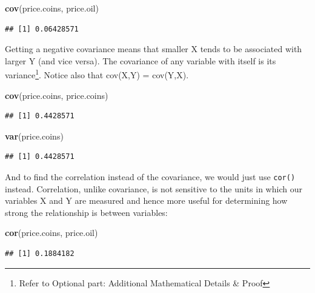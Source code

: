 \documentclass[]{article}
\newenvironment{Shaded}{\begin{snugshade}}{\end{snugshade}}
\newcommand{\KeywordTok}[1]{\textcolor[rgb]{0.13,0.29,0.53}{\textbf{#1}}}
\newcommand{\NormalTok}[1]{#1}
\begin{document}
\begin{Shaded}
\begin{Highlighting}[]
\KeywordTok{cov}\NormalTok{(price.coins, price.oil)}
\end{Highlighting}
\end{Shaded}

\begin{verbatim}
## [1] 0.06428571
\end{verbatim}

Getting a negative covariance means that smaller X tends to be
associated with larger Y (and vice versa). The covariance of any
variable with itself is its variance\footnote{Refer to Optional part:
  Additional Mathematical Details \& Proof}. Notice also that cov(X,Y) =
cov(Y,X).

\begin{Shaded}
\begin{Highlighting}[]
\KeywordTok{cov}\NormalTok{(price.coins, price.coins)}
\end{Highlighting}
\end{Shaded}

\begin{verbatim}
## [1] 0.4428571
\end{verbatim}

\begin{Shaded}
\begin{Highlighting}[]
\KeywordTok{var}\NormalTok{(price.coins)}
\end{Highlighting}
\end{Shaded}

\begin{verbatim}
## [1] 0.4428571
\end{verbatim}

And to find the correlation instead of the covariance, we would just use
\texttt{cor()} instead. Correlation, unlike covariance, is not sensitive
to the units in which our variables X and Y are measured and hence more
useful for determining how strong the relationship is between variables:

\begin{Shaded}
\begin{Highlighting}[]
\KeywordTok{cor}\NormalTok{(price.coins, price.oil)}
\end{Highlighting}
\end{Shaded}

\begin{verbatim}
## [1] 0.1884182
\end{verbatim}
\end{document}

